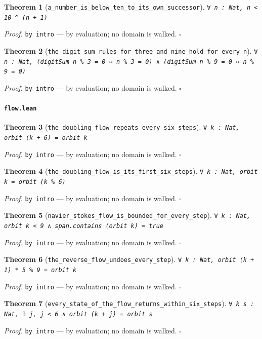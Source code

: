 \documentclass[11pt]{article}
\newtheorem{theorem}{Theorem}[section]
\begin{document}
\begin{theorem}[\texttt{a\_number\_is\_below\_ten\_to\_its\_own\_successor}]
\texttt{∀ n : Nat, n < 10 ^ (n + 1)}
\end{theorem}
\noindent\emph{Proof.} \texttt{by
  intro} --- by evaluation; no domain is walked. \hfill$\square$

\begin{theorem}[\texttt{the\_digit\_sum\_rules\_for\_three\_and\_nine\_hold\_for\_every\_n}]
\texttt{∀ n : Nat, (digitSum n \% 3 = 0 ↔ n \% 3 = 0) ∧ (digitSum n \% 9 = 0 ↔ n \% 9 = 0)}
\end{theorem}
\noindent\emph{Proof.} \texttt{by
  intro} --- by evaluation; no domain is walked. \hfill$\square$

\paragraph{\texttt{flow.lean}}

\begin{theorem}[\texttt{the\_doubling\_flow\_repeats\_every\_six\_steps}]
\texttt{∀ k : Nat, orbit (k + 6) = orbit k}
\end{theorem}
\noindent\emph{Proof.} \texttt{by
  intro} --- by evaluation; no domain is walked. \hfill$\square$

\begin{theorem}[\texttt{the\_doubling\_flow\_is\_its\_first\_six\_steps}]
\texttt{∀ k : Nat, orbit k = orbit (k \% 6)}
\end{theorem}
\noindent\emph{Proof.} \texttt{by
  intro} --- by evaluation; no domain is walked. \hfill$\square$

\begin{theorem}[\texttt{navier\_stokes\_flow\_is\_bounded\_for\_every\_step}]
\texttt{∀ k : Nat, orbit k < 9 ∧ span.contains (orbit k) = true}
\end{theorem}
\noindent\emph{Proof.} \texttt{by
  intro} --- by evaluation; no domain is walked. \hfill$\square$

\begin{theorem}[\texttt{the\_reverse\_flow\_undoes\_every\_step}]
\texttt{∀ k : Nat, orbit (k + 1) * 5 \% 9 = orbit k}
\end{theorem}
\noindent\emph{Proof.} \texttt{by
  intro} --- by evaluation; no domain is walked. \hfill$\square$

\begin{theorem}[\texttt{every\_state\_of\_the\_flow\_returns\_within\_six\_steps}]
\texttt{∀ k s : Nat, ∃ j, j < 6 ∧ orbit (k + j) = orbit s}
\end{theorem}
\noindent\emph{Proof.} \texttt{by
  intro} --- by evaluation; no domain is walked. \hfill$\square$
\end{document}

